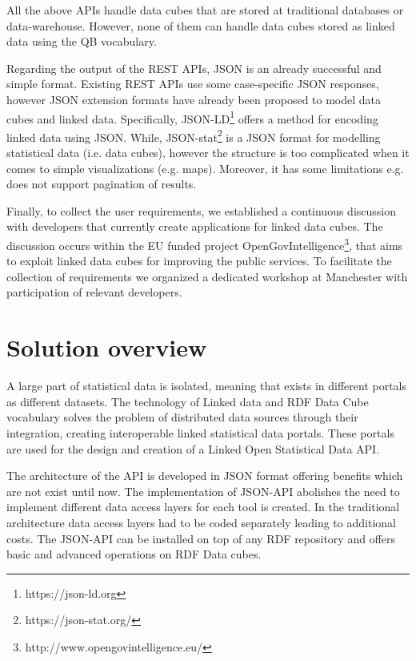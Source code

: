 \documentclass{llncs}
\begin{document}
All the above APIs handle data cubes that are stored at traditional databases or data-warehouse. However, none of them can handle data cubes  stored as linked data using the QB vocabulary.  

Regarding the output of the REST APIs, JSON is an already successful and simple format. Existing REST APIs use some case-specific JSON responses, however JSON extension formats have already been proposed to model data cubes and linked data. Specifically, JSON-LD\footnote{https://json-ld.org} offers a method for encoding linked data using JSON. While, JSON-stat\footnote{https://json-stat.org/} is a JSON format for modelling statistical data (i.e. data cubes), however the structure is too complicated when it comes to simple visualizations (e.g. maps). Moreover, it has some limitations e.g. does not support pagination of results. 

Finally, to collect the user requirements, we established a continuous discussion with developers that currently create applications for linked data cubes. The discussion occurs within the EU funded project OpenGovIntelligence\footnote{http://www.opengovintelligence.eu/}, that aims to exploit linked data cubes for improving the public services. To facilitate the collection of requirements we organized a dedicated workshop at Manchester with participation of relevant developers. 


\section{Solution overview}\label{sec:overview}

A large part of statistical data is isolated, meaning that exists in different portals as different datasets. The technology of Linked data and RDF Data Cube vocabulary solves the problem of distributed data sources through their integration, creating interoperable linked statistical data portals. These portals are used for the design and creation of a Linked Open Statistical Data API.
 
The architecture of the API is developed in JSON format offering benefits which are not exist until now. The implementation of JSON-API abolishes the need to implement different data access layers for each tool is created. In the traditional architecture data access layers had to be coded separately leading to additional costs. The JSON-API can be installed on top of any RDF repository and offers basic and advanced operations on RDF Data cubes.
 
\end{document}
